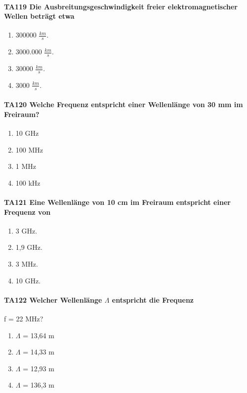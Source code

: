 \documentclass[8pt]{article}
\begin{document}
\begin{enumerate}
\paragraph*{TA119 Die Ausbreitungsgeschwindigkeit freier elektromagnetischer Wellen beträgt etwa}
\begin{enumerate}[nolistsep,label=\Alph*]
\item 300000 $\frac{km}{s}$.
\item 3000.000 $\frac{km}{s}$.
\item 30000 $\frac{km}{s}$.
\item 3000 $\frac{km}{s}$. 
\end{enumerate}



\paragraph*{TA120 Welche Frequenz entspricht einer Wellenlänge von 30 mm im Freiraum?}
\begin{enumerate}[nolistsep,label=\Alph*]
\item 10 GHz
\item 100 MHz
\item 1 MHz
\item 100 kHz
\end{enumerate}



\paragraph*{TA121 Eine Wellenlänge von 10 cm im Freiraum entspricht einer Frequenz von}
\begin{enumerate}[nolistsep,label=\Alph*]
\item 3 GHz.
\item 1,9 GHz.
\item 3 MHz.
\item 10 GHz.
\end{enumerate}



\paragraph*{TA122 Welcher Wellenlänge $\Lambda$ entspricht die Frequenz} f = 22 MHz?
\begin{enumerate}[nolistsep,label=\Alph*]
\item $\Lambda$ = 13,64 m
\item $\Lambda$ = 14,33 m
\item $\Lambda$ = 12,93 m
\item $\Lambda$ = 136,3 m
\end{enumerate}




\end{enumerate}
\end{document}
